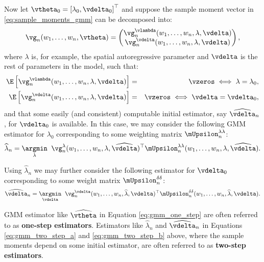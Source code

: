 Now let $\vtheta_0 = \left[\lambda_0, \vdelta_0\right]^\top$ and suppose the sample moment vector in \eqref{eq:sample_moments_gmm} can be decomposed into:
\begin{equation*}
\vg_n(w_1,\ldots ,w_n, \vtheta) = 
\begin{pmatrix}
\vg_n^{\vlambda}(w_1,\ldots,w_n, \lambda, \vdelta) \\
\vg_n^{\vdelta}(w_1,\ldots,w_n, \lambda, \vdelta) 
\end{pmatrix},
\end{equation*}
%
where $\lambda$ is, for example, the spatial autoregressive parameter and $\vdelta$ is the rest of parameters in the model, such that:
\begin{eqnarray*}
\E\left[\vg_n^{\vlambda}(w_1,\ldots,w_n, \lambda, \vdelta)\right] &=& \vzeros \iff \lambda = \lambda_0,\\
\E\left[\vg_n^{\vdelta}(w_1,\ldots,w_n, \lambda, \vdelta)\right] &=& \vzeros \iff \vdelta = \vdelta_0,
\end{eqnarray*}
%
and that some easily (and consistent) computable initial estimator, say $\widehat{\vdelta}_n$, for $\vdelta_0$ is available. In this case, we may consider the following GMM estimator for $\lambda_0$ corresponding to some weighting matrix $\mUpsilon^{\lambda\lambda}_n$:
\begin{equation}\label{eq:gmm_two_step_a}
\widehat{\lambda}_n = \underset{\lambda}{\argmin}\;\;\vg_n^{\lambda}(w_1,\ldots,w_n, \lambda, \widehat{\vdelta})^\top\mUpsilon^{\lambda\lambda}_n(w_1,\ldots,w_n, \lambda, \widehat{\vdelta}).
\end{equation}

Using $\widehat{\lambda}_n$ we may further consider the following estimator for $\vdelta_0$ corresponding to some weight matrix $\mUpsilon^{\delta\delta}_n$:
\begin{equation}\label{eq:gmm_two_step_b}
\widehat{\vdelta}_n = \underset{\vdelta}{\argmin}\;\;\vg_n^{\vdelta}(w_1,\ldots,w_n, \widehat{\lambda}, \vdelta)^\top\mUpsilon^{\delta\delta}_n(w_1,\ldots,w_n, \widehat{\lambda}, \vdelta).
\end{equation}

GMM estimator like $\widehat{\vtheta}$ in Equation \eqref{eq:gmm_one_step} are often referred to as \textbf{one-step estimators}. Estimators like $\widehat{\lambda}_n$ and $\widehat{\vdelta}_n$ in Equations \eqref{eq:gmm_two_step_a} and \eqref{eq:gmm_two_step_b} above, where the sample moments depend on some initial estimator, are often referred to as \textbf{two-step estimators}.

